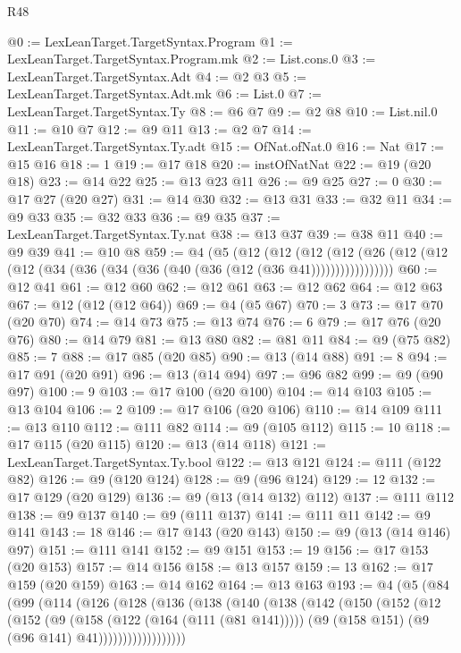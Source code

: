 \begin{lexlean}{R48}
\begin{coremodule}
@0 := LexLeanTarget.TargetSyntax.Program
@1 := LexLeanTarget.TargetSyntax.Program.mk
@2 := List.cons.{0}
@3 := LexLeanTarget.TargetSyntax.Adt
@4 := @2 @3
@5 := LexLeanTarget.TargetSyntax.Adt.mk
@6 := List.{0}
@7 := LexLeanTarget.TargetSyntax.Ty
@8 := @6 @7
@9 := @2 @8
@10 := List.nil.{0}
@11 := @10 @7
@12 := @9 @11
@13 := @2 @7
@14 := LexLeanTarget.TargetSyntax.Ty.adt
@15 := OfNat.ofNat.{0}
@16 := Nat
@17 := @15 @16
@18 := 1
@19 := @17 @18
@20 := instOfNatNat
@22 := @19 (@20 @18)
@23 := @14 @22
@25 := @13 @23 @11
@26 := @9 @25
@27 := 0
@30 := @17 @27 (@20 @27)
@31 := @14 @30
@32 := @13 @31
@33 := @32 @11
@34 := @9 @33
@35 := @32 @33
@36 := @9 @35
@37 := LexLeanTarget.TargetSyntax.Ty.nat
@38 := @13 @37
@39 := @38 @11
@40 := @9 @39
@41 := @10 @8
@59 := @4
    (@5
      (@12
        (@12
          (@12 (@12 (@26 (@12 (@12 (@12 (@34 (@36 (@34 (@36 (@40 (@36 (@12 (@36 @41)))))))))))))))))
@60 := @12 @41
@61 := @12 @60
@62 := @12 @61
@63 := @12 @62
@64 := @12 @63
@67 := @12 (@12 (@12 @64))
@69 := @4 (@5 @67)
@70 := 3
@73 := @17 @70 (@20 @70)
@74 := @14 @73
@75 := @13 @74
@76 := 6
@79 := @17 @76 (@20 @76)
@80 := @14 @79
@81 := @13 @80
@82 := @81 @11
@84 := @9 (@75 @82)
@85 := 7
@88 := @17 @85 (@20 @85)
@90 := @13 (@14 @88)
@91 := 8
@94 := @17 @91 (@20 @91)
@96 := @13 (@14 @94)
@97 := @96 @82
@99 := @9 (@90 @97)
@100 := 9
@103 := @17 @100 (@20 @100)
@104 := @14 @103
@105 := @13 @104
@106 := 2
@109 := @17 @106 (@20 @106)
@110 := @14 @109
@111 := @13 @110
@112 := @111 @82
@114 := @9 (@105 @112)
@115 := 10
@118 := @17 @115 (@20 @115)
@120 := @13 (@14 @118)
@121 := LexLeanTarget.TargetSyntax.Ty.bool
@122 := @13 @121
@124 := @111 (@122 @82)
@126 := @9 (@120 @124)
@128 := @9 (@96 @124)
@129 := 12
@132 := @17 @129 (@20 @129)
@136 := @9 (@13 (@14 @132) @112)
@137 := @111 @112
@138 := @9 @137
@140 := @9 (@111 @137)
@141 := @111 @11
@142 := @9 @141
@143 := 18
@146 := @17 @143 (@20 @143)
@150 := @9 (@13 (@14 @146) @97)
@151 := @111 @141
@152 := @9 @151
@153 := 19
@156 := @17 @153 (@20 @153)
@157 := @14 @156
@158 := @13 @157
@159 := 13
@162 := @17 @159 (@20 @159)
@163 := @14 @162
@164 := @13 @163
@193 := @4
    (@5
      (@84
        (@99
          (@114
            (@126
              (@128
                (@136
                  (@138
                    (@140
                      (@138
                        (@142
                          (@150
                            (@152
                              (@12
                                (@152
                                  (@9
                                    (@158 (@122 (@164 (@111 (@81 @141)))))
                                    (@9 (@158 @151) (@9 (@96 @141) @41))))))))))))))))))

\end{coremodule}
\end{lexlean}
